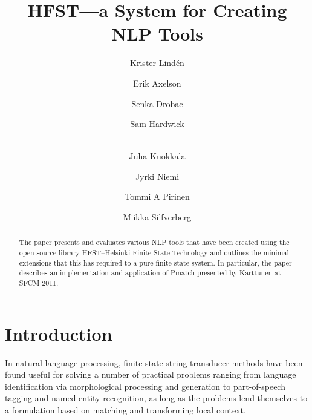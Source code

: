 \documentclass{llncs}
\begin{document}
%
\title{HFST---a System for Creating NLP Tools}
%
\author{Krister Lind\'{e}n \and Erik Axelson \and Senka Drobac \and Sam Hardwick \and\\
Juha Kuokkala \and Jyrki Niemi \and Tommi A Pirinen \and Miikka Silfverberg}

\institute{University of Helsinki\\
Department of Modern Languages\\
Unioninkatu 40 A\\
FI-00014 University of Helsinki, Finland\\
\email{\{krister.linden, erik.axelson, senka.drobac, sam.hardwick,\\
juha.kuokkala, jyrki.niemi, tommi.pirinen, miikka.silfverberg\}@helsinki.fi}}

\maketitle


\begin{abstract}
The paper presents and evaluates various NLP tools that have been created using the open source library HFST--Helsinki Finite-State Technology and outlines the minimal extensions that this has required to a pure finite-state system. In particular, the paper describes an implementation and application of Pmatch presented by Karttunen at SFCM 2011.
\end{abstract}

\section*{Introduction}
In natural language processing, finite-state string transducer methods have been found useful for solving a number of practical problems ranging from language identification via morphological processing and generation to part-of-speech tagging and named-entity recognition, as long as the problems lend themselves to a formulation based on matching and transforming local context.
\end{document}
